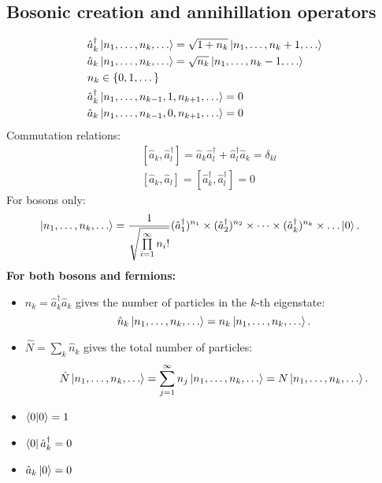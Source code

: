 \documentclass[11pt, a4paper]{article}
\begin{document}
\subsection{Bosonic creation and annihillation operators}
\begin{align*}
    &\hat a_k^{\dagger} \ket{n_1, \dots, n_k, \dots} = \sqrt{1+n_k}\ket{n_1, \dots, n_k + 1, \dots} \\
    &\hat a_k \ket{n_1, \dots, n_k, \dots} = \sqrt{n_k} \ket{n_1, \dots, n_k - 1, \dots} \\
    &n_k \in \{0,1,\dots\}\\
    &\hat a_k^{\dagger} \ket{n_1, \dots, n_{k-1}, 1, n_{k+1},\dots} = 0 \\
    &\hat a_k \ket{n_1, \dots, n_{k-1}, 0, n_{k+1},\dots} = 0\\
\end{align*}
Commutation relations:
\begin{align*}
    &[\hat a_k, \hat a_l^{\dagger}]  = \hat a_k\hat a_l^{\dagger}+\hat a_l^{\dagger}\hat a_k = \delta_{kl}\\
    &[\hat a_k, \hat a_l] = [ \hat a_k^{\dagger}, \hat a_l^{\dagger} ] = 0
\end{align*}
For bosons only:
\begin{align*}
    &\ket{n_1, \dots, n_k, \dots} = \frac{1}{\sqrt{\prod\limits_{i=1}^{\infty}n_i!}}
    (\hat a_1^{\dagger})^{n_1}\times(\hat a_2^{\dagger})^{n_2}\times\dots\times(\hat a_k^{\dagger})^{n_k}\times
    \dots\ket{0}.
\end{align*}
\textbf{For both bosons and fermions:}
\begin{itemize}
    \item $\hat n_k = \hat a_k^{\dagger}\hat a_k $ gives the number of particles in the $k$-th eigenstate:
    \begin{equation*}
        \hat n_k \ket{n_1, \dots, n_k, \dots} = n_k \ket{n_1, \dots, n_k, \dots}.
    \end{equation*}
    \item $\hat N = \sum\limits_k \hat n_k$ gives the total number of particles:
    \begin{equation*}
        \hat N \ket{n_1, \dots, n_k, \dots} = \sum\limits_{j=1}^{\infty}n_j \ket{n_1, \dots, n_k, \dots}
        = N \ket{n_1, \dots, n_k, \dots}.
    \end{equation*}
    \item $\braket{0|0} = 1$
    \item $\bra 0 \hat a_k^{\dagger} = 0$
    \item $\hat a_k \ket 0 = 0$
\end{itemize}
\end{document}
